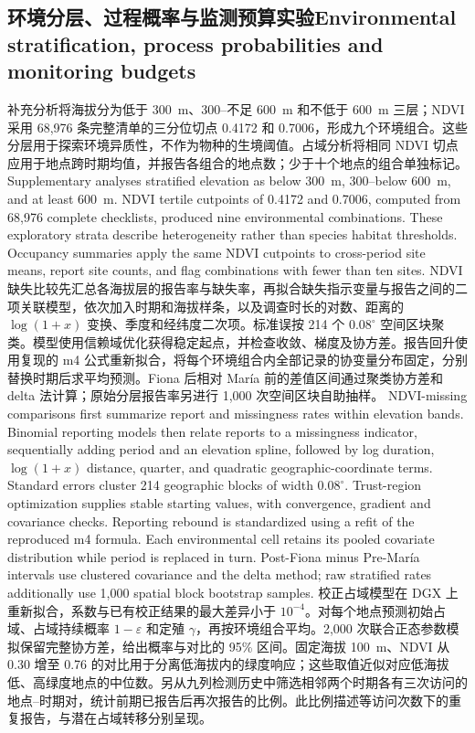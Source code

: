 \subsection{\ifzh 环境分层、过程概率与监测预算实验\else Environmental stratification, process probabilities and monitoring budgets\fi}
\label{sec:envmethods}
\ifzh
补充分析将海拔分为低于 300~m、300--不足 600~m 和不低于 600~m 三层；NDVI 采用 68,976 条完整清单的三分位切点 0.4172 和 0.7006，形成九个环境组合。这些分层用于探索环境异质性，不作为物种的生境阈值。占域分析将相同 NDVI 切点应用于地点跨时期均值，并报告各组合的地点数；少于十个地点的组合单独标记。
\else
Supplementary analyses stratified elevation as below 300~m, 300--below 600~m, and at least 600~m. NDVI tertile cutpoints of 0.4172 and 0.7006, computed from 68,976 complete checklists, produced nine environmental combinations. These exploratory strata describe heterogeneity rather than species habitat thresholds. Occupancy summaries apply the same NDVI cutpoints to cross-period site means, report site counts, and flag combinations with fewer than ten sites.
\fi
\ifzh
NDVI 缺失比较先汇总各海拔层的报告率与缺失率，再拟合缺失指示变量与报告之间的二项关联模型，依次加入时期和海拔样条，以及调查时长的对数、距离的 $\log(1+x)$ 变换、季度和经纬度二次项。标准误按 214 个 $0.08^\circ$ 空间区块聚类。模型使用信赖域优化获得稳定起点，并检查收敛、梯度及协方差。报告回升使用复现的 m4 公式重新拟合，将每个环境组合内全部记录的协变量分布固定，分别替换时期后求平均预测。Fiona 后相对 María 前的差值区间通过聚类协方差和 delta 法计算；原始分层报告率另进行 1,000 次空间区块自助抽样。
\else
NDVI-missing comparisons first summarize report and missingness rates within elevation bands. Binomial reporting models then relate reports to a missingness indicator, sequentially adding period and an elevation spline, followed by log duration, $\log(1+x)$ distance, quarter, and quadratic geographic-coordinate terms. Standard errors cluster 214 geographic blocks of width $0.08^\circ$. Trust-region optimization supplies stable starting values, with convergence, gradient and covariance checks. Reporting rebound is standardized using a refit of the reproduced m4 formula. Each environmental cell retains its pooled covariate distribution while period is replaced in turn. Post-Fiona minus Pre-Mar\'ia intervals use clustered covariance and the delta method; raw stratified rates additionally use 1,000 spatial block bootstrap samples.
\fi
\ifzh
校正占域模型在 DGX 上重新拟合，系数与已有校正结果的最大差异小于 $10^{-4}$。对每个地点预测初始占域、占域持续概率 $1-\varepsilon$ 和定殖 $\gamma$，再按环境组合平均。2,000 次联合正态参数模拟保留完整协方差，给出概率与对比的 95\% 区间。固定海拔 100~m、NDVI 从 0.30 增至 0.76 的对比用于分离低海拔内的绿度响应；这些取值近似对应低海拔低、高绿度地点的中位数。另从九列检测历史中筛选相邻两个时期各有三次访问的地点--时期对，统计前期已报告后再次报告的比例。此比例描述等访问次数下的重复报告，与潜在占域转移分别呈现。

